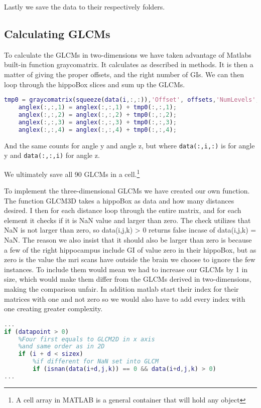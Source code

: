 Lastly we save the data to their respectively folders.

\subsection{Calculating GLCMs}

To calculate the GLCMs in two-dimensions we have taken advantage of Matlabs built-in function graycomatrix. It calculates as described in methods. It is then a matter of giving the proper offsets, and the right number of GIs. We can then loop through the hippoBox slices and sum up the GLCMs.

\begin{lstlisting}[language=Matlab]
    tmp0 = graycomatrix(squeeze(data(i,:,:)),'Offset', offsets,'NumLevels', 256, 'GrayLimits', [0 256]);
    anglex(:,:,1) = anglex(:,:,1) + tmp0(:,:,1);
    anglex(:,:,2) = anglex(:,:,2) + tmp0(:,:,2);
    anglex(:,:,3) = anglex(:,:,3) + tmp0(:,:,3);
    anglex(:,:,4) = anglex(:,:,4) + tmp0(:,:,4);
\end{lstlisting}

And the same counts for angle y and angle z, but where \texttt{data(:,i,:)} is for angle y and \texttt{data(:,:,i)} for angle z.


We ultimately save all 90 GLCMs in a cell.\footnote{A cell array in MATLAB is a general container that will hold any object}

To implement the three-dimensional GLCMs we have created our own function.
The function GLCM3D takes a hippoBox as data and how many distances desired. I then for each distance loop through the entire matrix, and for each element it checks if it is NaN value and larger than zero. The check utilizes that NaN is not larger than zero, so data(i,j,k) > 0 returns false incase of data(i,j,k) = NaN.
The reason we also insist that it should also be larger than zero is because a few of the right hippocampus include GI of value zero in their hippoBox, but as zero is the value the mri scans have outside the brain we choose to ignore the few instances. To include them would mean we had to increase our GLCMs by 1 in size, which would make them differ from the GLCMs derived in two-dimensions, making the comparison unfair. In addition matlab start their index for their matrices with one and not zero so we would also have to add every index with one creating greater complexity.

\begin{lstlisting}[language=Matlab]
...
if (datapoint > 0)
    %Four first equals to GLCM2D in x axis
    %and same order as in 2D
    if (i + d < sizex)
        %if different for NaN set into GLCM
        if (isnan(data(i+d,j,k)) == 0 && data(i+d,j,k) > 0)
...                    
\end{lstlisting}

